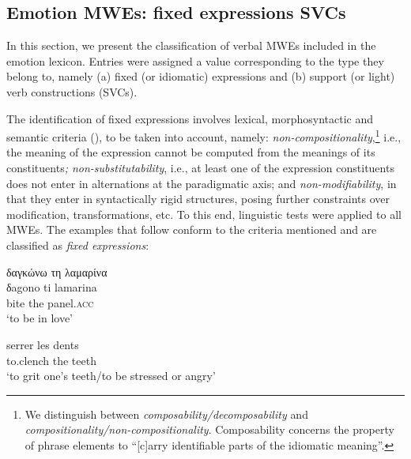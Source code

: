 \documentclass[output=paper]{langsci/langscibook}
\begin{document}
\subsection{Emotion MWEs: fixed expressions \textendash{} SVCs }
\label{section51}


In this section, we present the classification of verbal MWEs included in the emotion lexicon. Entries were assigned a value
corresponding to the type they belong to, namely (a) fixed (or
idiomatic) expressions and (b) support (or light) verb constructions
(SVCs).



The identification of fixed expressions
involves lexical, morphosyntactic and semantic criteria (\citealt{gross1982,Gross1988a,lamiroy2003}), to be taken into account, namely:
\textit{non-compositionality},\footnote{We distinguish between
\textit{composability/decomposability} \citep[496]{Nunberg1994} and 
\textit{compositionality/non-compositionality}.  Composability concerns
the property of phrase elements to ``[c]arry
identifiable parts of the idiomatic meaning”.} i.e., the meaning of the expression cannot
be computed from the meanings of its constituents\textit{;
non-substitutability}, i.e., at least one of the expression
constituents does not enter in alternations at the paradigmatic axis;
and \textit{non-modifiability}, in that they enter in
syntactically rigid structures, posing further constraints over
modification, transformations, etc. To this end, linguistic tests were
applied to all MWEs. The examples that follow conform to the criteria
mentioned and are classified as \textit{fixed expressions}:

\begin{exe}
\ex \label{ex:3:6}
\glll δαγκώνω τη λαμαρίνα \\
δagono ti lamarina\\
bite the panel.\textsc{acc}\\
\glt %
‘to be in love’
\end{exe}

\begin{exe}
\ex \label{ex:3:7}
\gll serrer les dents \\
to.clench the teeth\\
\glt ‘to grit one's teeth/to be stressed or angry’
\end{exe}
\end{document}

